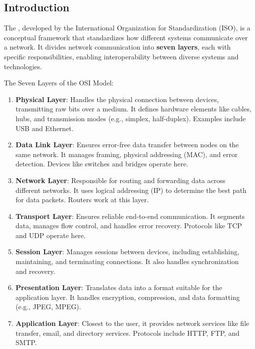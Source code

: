 \subsection{Introduction}

\begin{remarkbox}
    The , developed by the International Organization for Standardization (ISO), is a conceptual framework that standardizes how different systems communicate over a network. It divides network communication into \textbf{seven layers}, each with specific responsibilities, enabling interoperability between diverse systems and technologies.

    \highspace
    The Seven Layers of the OSI Model:
    \begin{enumerate}
        \item \textbf{Physical Layer}: Handles the physical connection between devices, transmitting raw bits over a medium. It defines hardware elements like cables, hubs, and transmission modes (e.g., simplex, half-duplex). Examples include USB and Ethernet.

        \item \textbf{Data Link Layer}: Ensures error-free data transfer between nodes on the same network. It manages framing, physical addressing (MAC), and error detection. Devices like switches and bridges operate here.

        \item \textbf{Network Layer}: Responsible for routing and forwarding data across different networks. It uses logical addressing (IP) to determine the best path for data packets. Routers work at this layer.

        \item \textbf{Transport Layer}: Ensures reliable end-to-end communication. It segments data, manages flow control, and handles error recovery. Protocols like TCP and UDP operate here.

        \item \textbf{Session Layer}: Manages sessions between devices, including establishing, maintaining, and terminating connections. It also handles synchronization and recovery.

        \item \textbf{Presentation Layer}: Translates data into a format suitable for the application layer. It handles encryption, compression, and data formatting (e.g., JPEG, MPEG).

        \item \textbf{Application Layer}: Closest to the user, it provides network services like file transfer, email, and directory services. Protocols include HTTP, FTP, and SMTP.
    \end{enumerate}
\end{remarkbox}

